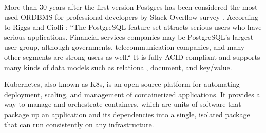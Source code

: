 More than 30 years after the first version Postgres has been considered the most used ORDBMS for professional developers by Stack Overflow survey \cite{so2022survey}. According to Riggs and Ciolli \cite{pg14introduction}: “The PostgreSQL feature set attracts serious users who have serious applications. Financial services companies may be PostgreSQL's largest user group, although governments, telecommunication companies, and many other segments are strong users as well.“ It is fully ACID compliant \cite{juba2015learningTransactionIsolation} and supports many kinds of data models such as relational, document, and key/value. \cite{pg14introduction}


Kubernetes, also known as K8s, is an open-source platform for automating deployment, scaling, and management of containerized applications. It provides a way to manage and orchestrate containers, which are units of software that package up an application and its dependencies into a single, isolated package that can run consistently on any infrastructure. \cite{vayghan2019kubernetes}

